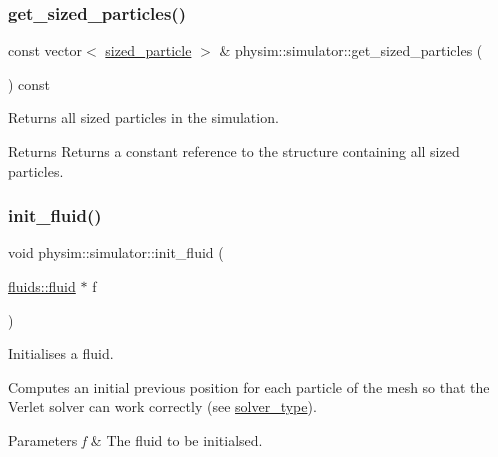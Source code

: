\subsubsection{\texorpdfstring{get\+\_\+sized\+\_\+particles()}{get\_sized\_particles()}}
{\footnotesize\ttfamily const vector$<$ \hyperlink{classphysim_1_1particles_1_1sized__particle}{sized\+\_\+particle} $>$ \& physim\+::simulator\+::get\+\_\+sized\+\_\+particles (\begin{DoxyParamCaption}{ }\end{DoxyParamCaption}) const}



Returns all sized particles in the simulation. 

\begin{DoxyReturn}{Returns}
Returns a constant reference to the structure containing all sized particles. 
\end{DoxyReturn}
\mbox{\label{classphysim_1_1simulator_afc4f4dc27c302b5dd31824429d67104c}} 
\subsubsection{\texorpdfstring{init\+\_\+fluid()}{init\_fluid()}}
{\footnotesize\ttfamily void physim\+::simulator\+::init\+\_\+fluid (\begin{DoxyParamCaption}\item[{\hyperlink{classphysim_1_1fluids_1_1fluid}{fluids\+::fluid} $\ast$}]{f }\end{DoxyParamCaption})\hspace{0.3cm}{\ttfamily [private]}}



Initialises a fluid. 

Computes an initial previous position for each particle of the mesh so that the Verlet solver can work correctly (see \hyperlink{namespacephysim_a09adeda29c09e651877e880d31fc9686}{solver\+\_\+type}). 
\begin{DoxyParams}{Parameters}
{\em f} & The fluid to be initialsed. \\
\hline
\end{DoxyParams}
\mbox{\label{classphysim_1_1simulator_a5344fb7665e2f4c0e7930f7897f9a3bf}} 
